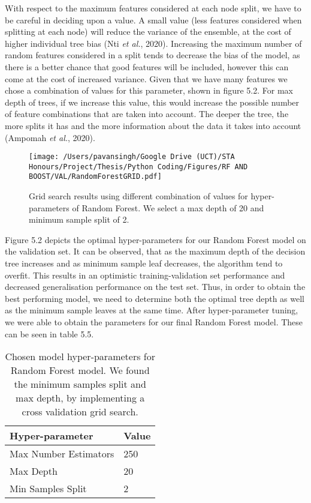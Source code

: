 With respect to the maximum features considered at each node split, we have to be careful in deciding upon a value.  A small value (less features considered when splitting at each node) will reduce the variance of the ensemble, at the cost of higher individual tree bias (Nti \textit{et al.}, 2020). Increasing the maximum number of random features considered in a split tends to decrease the bias of the model, as there is a better chance that good features will be included, however this can come at the cost of increased variance. Given that we have many features we chose a combination of values for this parameter, shown in figure 5.2. For max depth of trees, if we increase this value,  this would increase the possible number of feature combinations that are taken into account. The deeper the tree, the more splits it has and the more information about the data it takes into account (Ampomah \textit{et al.}, 2020).

\begin{figure}[h]
\centering
  \texttt{[image: /Users/pavansingh/Google Drive (UCT)/STA Honours/Project/Thesis/Python Coding/Figures/RF AND BOOST/VAL/RandomForestGRID.pdf]}
  \caption{Grid search results using different combination of values for hyper-parameters of Random Forest. We select a max depth of 20 and minimum sample split of 2.}
  \label{}
\end{figure}

Figure 5.2 depicts the optimal hyper-parameters for our Random Forest model on the validation set. It can be observed, that as the maximum depth of the decision tree increases and as minimum sample leaf decreases, the algorithm tend to overfit. This results in an optimistic training-validation set performance and decreased generalisation performance on the test set. Thus, in order to obtain the best performing model, we need to determine both the optimal tree depth as well as the minimum sample leaves at the same time. After hyper-parameter tuning, we were able to obtain the parameters for our final Random Forest model. These can be seen in table 5.5.

 
\begin{table}[h]
\centering
\begin{tabular}{ll}
\hline
Hyper-parameter   &  Value \\
\hline
Max Number Estimators       & 250  \\
Max Depth & 20 \\
Min Samples Split & 2 \\
\hline
\end{tabular}
\caption{Chosen model hyper-parameters for Random Forest model. We found the minimum samples split and max depth, by implementing a cross validation grid search.}
\end{table}




